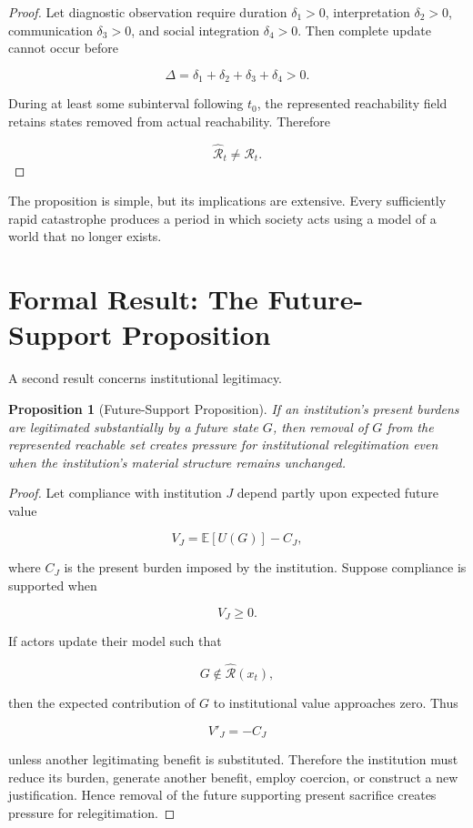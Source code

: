\documentclass[11pt,oneside]{book}
\newtheorem{proposition}[theorem]{Proposition}
\theoremstyle{definition}
\theoremstyle{remark}
\newcommand{\R}{\mathcal{R}}
\begin{document}
\begin{proof}
Let diagnostic observation require duration \(\delta_1>0\), interpretation \(\delta_2>0\), communication \(\delta_3>0\), and social integration \(\delta_4>0\). Then complete update cannot occur before

\[
\Delta
=
\delta_1+\delta_2+\delta_3+\delta_4>0.
\]

During at least some subinterval following \(t_0\), the represented reachability field retains states removed from actual reachability. Therefore

\[
\widehat{\R}_t\neq\R_t.
\]
\end{proof}

The proposition is simple, but its implications are extensive. Every sufficiently rapid catastrophe produces a period in which society acts using a model of a world that no longer exists.

\section{Formal Result: The Future-Support Proposition}

A second result concerns institutional legitimacy.

\begin{proposition}[Future-Support Proposition]
If an institution's present burdens are legitimated substantially by a future state \(G\), then removal of \(G\) from the represented reachable set creates pressure for institutional relegitimation even when the institution's material structure remains unchanged.
\end{proposition}

\begin{proof}
Let compliance with institution \(J\) depend partly upon expected future value

\[
V_J
=
\mathbb E[U(G)]-C_J,
\]

where \(C_J\) is the present burden imposed by the institution. Suppose compliance is supported when

\[
V_J\geq0.
\]

If actors update their model such that

\[
G\notin\widehat{\R}(x_t),
\]

then the expected contribution of \(G\) to institutional value approaches zero. Thus

\[
V'_J
=
-C_J
\]

unless another legitimating benefit is substituted. Therefore the institution must reduce its burden, generate another benefit, employ coercion, or construct a new justification. Hence removal of the future supporting present sacrifice creates pressure for relegitimation.
\end{proof}
\end{document}
